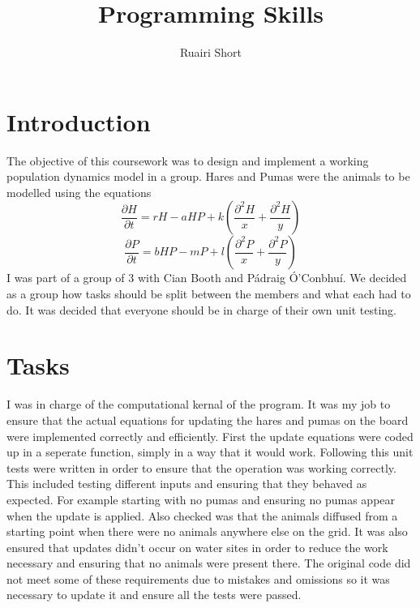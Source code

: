\documentclass[12pt]{article}    %
\title{Programming Skills}  %
\author{Ruairi Short}    %
\date{}   %
\numberwithin{equation}{section}
\newcommand{\pf}[2]{\frac{\partial{#1}}{\partial{#2}}}
\newcommand{\pa}{P\'{a}draig \'{O}'Conbhu\'{i}}
\begin{document}

\maketitle                 %
\begin{center}

\abstract{}
\clearpage
{}
\end{center}

\section{Introduction}
The objective of this coursework was to design and implement a working population dynamics model in a group.
Hares and Pumas were the animals to be modelled using the equations
\[\pf{H}{t}=rH-aHP+k\left(\frac{\partial^2H}{x}+\frac{\partial^2H}{y}\right)\]
\[\pf{P}{t}=bHP-mP+l\left(\frac{\partial^2P}{x}+\frac{\partial^2P}{y}\right)\]
I was part of a group of 3 with Cian Booth and \pa.
We decided as a group how tasks should be split between the members and what each had to do.
It was decided that everyone should be in charge of their own unit testing.

\section{Tasks}
I was in charge of the computational kernal of the program.
It was my job to ensure that the actual equations for updating the hares and pumas on the board were implemented correctly and efficiently.
First the update equations were coded up in a seperate function, simply in a way that it would work.
Following this unit tests were written in order to ensure that the operation was working correctly.
This included testing different inputs and ensuring that they behaved as expected.
For example starting with no pumas and ensuring no pumas appear when the update is applied.
Also checked was that the animals diffused from a starting point when there were no animals anywhere else on the grid.
It was also ensured that updates didn't occur on water sites in order to reduce the work necessary and ensuring that no animals were present there.
The original code did not meet some of these requirements due to mistakes and omissions so it was necessary to update it and ensure all the tests were passed.\\
\end{document}
